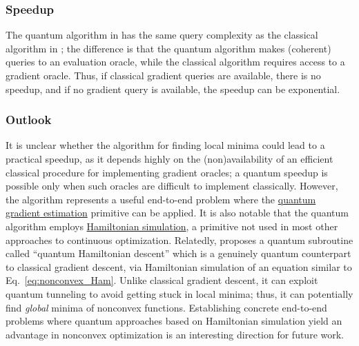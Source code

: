 \begin{refsection}
\subsubsection*{Speedup}

The quantum algorithm in \cite{zhang2021escapingSaddlePoints} has the same query complexity as the classical algorithm in \cite{zhang2021classicalEscapeSaddlePoints}; the difference is that the quantum algorithm makes (coherent) queries to an evaluation oracle, while the classical algorithm requires access to a gradient oracle. Thus, if classical gradient queries are available, there is no speedup, and if no gradient query is available, the speedup can be exponential.

\subsubsection*{Outlook}

It is unclear whether the algorithm for finding local minima could lead to a practical speedup, as it depends highly on the (non)availability of an efficient classical procedure for implementing gradient oracles; a quantum speedup is possible only when such oracles are difficult to implement classically. However, the algorithm represents a useful end-to-end problem where the \hyperref[prim:GradientEstimation]{quantum gradient estimation} primitive can be applied. It is also notable that the quantum algorithm employs \hyperref[prim:HamiltonianSimulation]{Hamiltonian simulation}, a primitive not used in most other approaches to continuous optimization. Relatedly, \cite{leng2023quantumHamiltonianDescent} proposes a quantum subroutine called ``quantum Hamiltonian descent'' which is a genuinely quantum counterpart to classical gradient descent, via Hamiltonian simulation of an equation similar to Eq.~\eqref{eq:nonconvex_Ham}. Unlike classical gradient descent, it can exploit quantum tunneling to avoid getting stuck in local minima; thus, it can potentially find \emph{global} minima of nonconvex functions.  Establishing concrete end-to-end problems where quantum approaches based on Hamiltonian simulation yield an advantage in nonconvex optimization is an interesting direction for future work.




\printbibliography[heading=secbib,segment=\therefsegment]
\end{refsection}

\newpage







